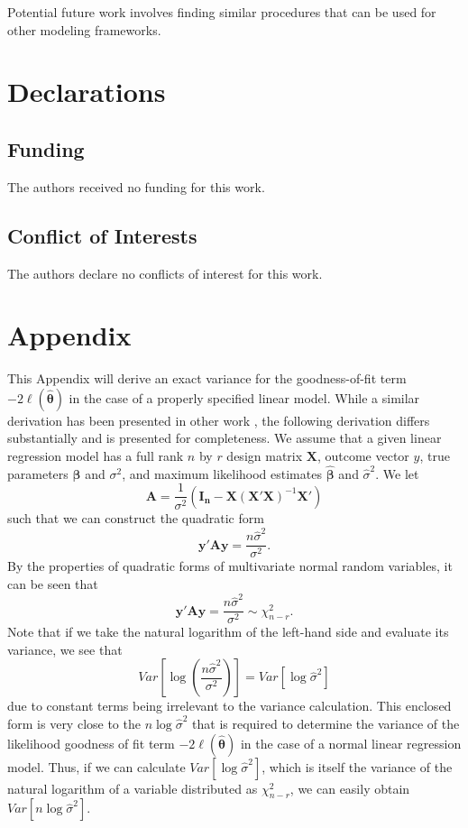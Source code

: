 \documentclass[sn-mathphys-ay]{sn-jnl}
\begin{document}
Potential future work involves finding similar procedures that can be used for other modeling frameworks.

\section*{Declarations}

\subsection*{Funding}

The authors received no funding for this work.

\subsection*{Conflict of Interests}

The authors declare no conflicts of interest for this work.


\section{Appendix}
This Appendix will derive an exact variance for the goodness-of-fit term $-2 \ell (\hat{\bm{\theta}} )$ in the case of a properly specified
linear model. While a similar derivation has been presented in other work \citep{McQuarrie}, the following derivation differs substantially and is presented for completeness.
We assume that a given linear regression model has a full rank $n$ by $r$ design matrix $\bm{X}$, outcome vector $y$, true parameters $\bm{\beta}$ and $\sigma^2$,
and maximum likelihood estimates $\hat{\bm{\beta}}$ and $\hat{\sigma}^2$. We let
\begin{equation*}
	\bm{A} = \frac{1}{\sigma^2} (\bm{I_n} - \bm{X}(\bm{X}'\bm{X})^{-1}\bm{X}') 
\end{equation*}
such that we can construct the quadratic form
\begin{equation*}
	\bm{y'Ay} = \frac{n \hat{\sigma}^2}{\sigma^2} .
\end{equation*}
By the properties of quadratic forms of multivariate normal random variables, it can be seen that
\begin{equation}
	\bm{y'Ay} = \frac{n \hat{\sigma}^2}{\sigma^2} \sim \chi^2_{n-r} .
\end{equation}
Note that if we take the natural logarithm of the left-hand side and evaluate its variance, we see that
\begin{equation}
	Var \left[ \log(\frac{n \hat{\sigma}^2}{\sigma^2}) \right]  = Var \left[ \log \hat{\sigma}^2 \right]
\end{equation}
due to constant terms being irrelevant to the variance calculation. This enclosed form is very close to the $n \log \hat{\sigma}^2$ that is required
to determine the variance of the likelihood goodness of fit term $-2 \ell (\hat{\bm{\theta}} )$ in the case of a normal linear regression model.
Thus, if we can calculate $Var \left[ \log \hat{\sigma}^2 \right]$, which is itself the variance
of the natural logarithm of a variable distributed as $\chi^2_{n-r}$, we can easily obtain $Var \left[ n \log \hat{\sigma}^2 \right]$.
\end{document}
